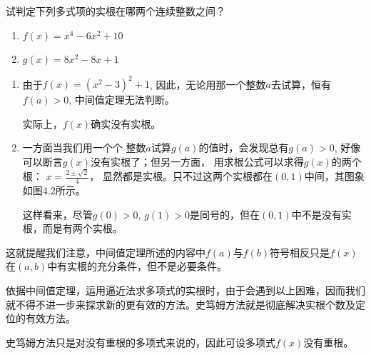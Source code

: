 \begin{example}
   试判定下列多式项的实根在哪两个连续整数之间？
\begin{multicols}{2}
 \begin{enumerate}
     \item $f (x) =x^4-6x^2+10$
     \item $g(x)=8x^2-8x+1$
 \end{enumerate}
\end{multicols}
\end{example}

\begin{solution}
\begin{enumerate}
    \item 由于$f(x)=(x^2-3)^2+1$, 因此，无论用那一个整数$a$去试算，恒有$f(a)>0$, 中间值定理无法判断。
    
    实际上，$f(x)$确实没有实根。
    \item 一方面当我们用一个个
    整数$a$试算$g(a)$的值时，会发现总有$g(a)>0$, 好像可以断言$g(x)$没有实根了；但另一方面，
    用求根公式可以求得$g(x)$的两个根：
    $x=\frac{2\pm\sqrt{2}}{4}$，
    显然都是实根。只不过这两个实根都在$(0, 1)$中间，其图象如图4.2所示。

    这样看来，尽管$g(0)>0$, $g(1)>0$是同号的，但在$(0, 1)$中不是没有实根，而是有两个实根。
\end{enumerate}

\begin{figure}[htp]
    \centering
{}
    \caption{}
\end{figure}
\end{solution}

这就提醒我们注意，中间值定理所述的内容中$f(a)$与$f(b)$符号相反只是$f(x)$在$(a,b)$中有实根的充分条件，但不是必要条件。
    
    依据中间值定理，运用逼近法求多项式的实根时，由于会遇到以上困难，因而我们就不得不进一步来探求新的更有效的方法。史笃姆方法就是彻底解决实根个数及定位的有效方法。
    
    史笃姆方法只是对没有重根的多项式来说的，因此可设多项式$f(x)$没有重根。

